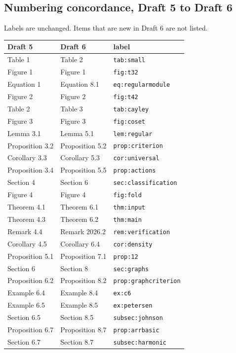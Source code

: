 \documentclass[12pt,letterpaper]{article}
\begin{document}
\subsection{Numbering concordance, Draft 5 to Draft 6}
Labels are unchanged. Items that are new in Draft 6 are not listed.
\begin{longtable}{@{}lll@{}}\toprule
Draft 5 & Draft 6 & label\\\midrule\endhead
Table 1 & Table 2 & \texttt{tab:small}\\
Figure 1 & Figure 1 & \texttt{fig:t32}\\
Equation 1 & Equation 8.1 & \texttt{eq:regularmodule}\\
Figure 2 & Figure 2 & \texttt{fig:t42}\\
Table 2 & Table 3 & \texttt{tab:cayley}\\
Figure 3 & Figure 3 & \texttt{fig:coset}\\
Lemma 3.1 & Lemma 5.1 & \texttt{lem:regular}\\
Proposition 3.2 & Proposition 5.2 & \texttt{prop:criterion}\\
Corollary 3.3 & Corollary 5.3 & \texttt{cor:universal}\\
Proposition 3.4 & Proposition 5.5 & \texttt{prop:actions}\\
Section 4 & Section 6 & \texttt{sec:classification}\\
Figure 4 & Figure 4 & \texttt{fig:fold}\\
Theorem 4.1 & Theorem 6.1 & \texttt{thm:input}\\
Theorem 4.3 & Theorem 6.2 & \texttt{thm:main}\\
Remark 4.4 & Remark 2026.2 & \texttt{rem:verification}\\
Corollary 4.5 & Corollary 6.4 & \texttt{cor:density}\\
Proposition 5.1 & Proposition 7.1 & \texttt{prop:12}\\
Section 6 & Section 8 & \texttt{sec:graphs}\\
Proposition 6.2 & Proposition 8.2 & \texttt{prop:graphcriterion}\\
Example 6.4 & Example 8.4 & \texttt{ex:c6}\\
Example 6.5 & Example 8.5 & \texttt{ex:petersen}\\
Section 6.5 & Section 8.5 & \texttt{subsec:johnson}\\
Proposition 6.7 & Proposition 8.7 & \texttt{prop:arrbasic}\\
Section 6.7 & Section 8.7 & \texttt{subsec:harmonic}\\

\end{longtable}
\end{document}
